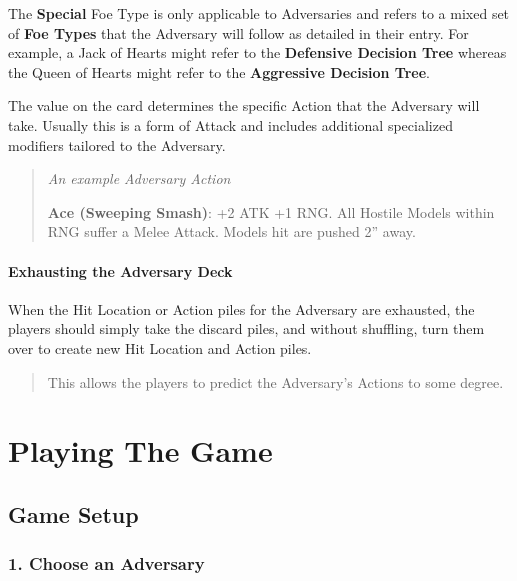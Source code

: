 \documentclass[
]{book}
\begin{document}
The \textbf{Special} Foe Type is only applicable to Adversaries and refers to a mixed set of \textbf{Foe Types} that the Adversary will follow as detailed in their entry. For example, a Jack of Hearts might refer to the \textbf{Defensive Decision Tree} whereas the Queen of Hearts might refer to the \textbf{Aggressive Decision Tree}.

The value on the card determines the specific Action that the Adversary will take. Usually this is a form of Attack and includes additional specialized modifiers tailored to the Adversary.

\begin{quote}
\emph{An example Adversary Action} 

\textbf{Ace (Sweeping Smash)}: +2 ATK +1 RNG. All Hostile Models within RNG suffer a Melee Attack. Models hit are pushed 2'' away.
\end{quote}

\hypertarget{exhausting-the-adversary-deck}{%
\subsubsection*{Exhausting the Adversary Deck}\label{exhausting-the-adversary-deck}}

When the Hit Location or Action piles for the Adversary are exhausted, the players should simply take the discard piles, and without shuffling, turn them over to create new Hit Location and Action piles.

\begin{quote}
This allows the players to predict the Adversary's Actions to some degree.
\end{quote}

\hypertarget{playing}{%
\chapter{Playing The Game}\label{playing}}

\hypertarget{setup}{%
\section{Game Setup}\label{setup}}

\hypertarget{choose-an-adversary}{%
\subsection*{1. Choose an Adversary}\label{choose-an-adversary}}
\end{document}
